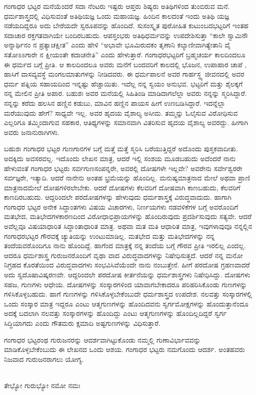 {ಗಂಗಾಧರ ಭಟ್ಟರ ಮನೆಯೆಂದರೆ ಸದಾ ನೆಂಟರು ಇಷ್ಟರು ಆಪ್ತರು ಶಿಷ್ಯರು ಅತಿಥಿ\-ಗಳಿಂದ ತುಂಬಿರುವ ಮನೆ. ಧರ್ಮಶಾಸ್ತ್ರದಲ್ಲಿ ವಿಧಿಸುವಂತೆ ಅತಿಥಿಯಜ್ಞ ಒಂದು ಮಹಾಯಜ್ಞ. ಹಿಂದಿನ ಕಾಲದಂತೆ ಇಂದು ಅತಿಥಿ ಯಜ್ಞ ನಡೆಯದಿದ್ದರೂ ಅದು ಬೇರೆಯದೇ ಸ್ವರೂಪವನ್ನು ಹೊಂದಿದೆ. ಸುಸಂಸ್ಕೃತ ಪುರೋಹಿತ ಕುಟುಂಬದ\break ಭಟ್ಟರಿಗೆ ಇಂತಹ ಸದಾಚಾರ ರಕ್ತಗತವಾಗಿಯೇ ಬಂದಿರಬಹುದು. ಆಪಸ್ತಂಭರು ಅತಿಥಿ\break ಧರ್ಮವನ್ನು ಉಪದೇಶಿಸುತ್ತಾ “ಕಾಲೇ ಸ್ವಾಮಿನೌ ಅನ್ನಾರ್ಥಿನಂ ನ ಪ್ರತ್ಯಾಚಕ್ಷೀತ” ಎಂದು ಹೇಳಿ “ಅಭಾವೇ ಭೂಮಿರುದಕಂ ತೃಣಾನಿ ಕಲ್ಯಾಣೀವಾಗಿತ್ಯೇತಾನಿ ವೈ ಸತೋಽಽ\-ಗಾರೇ ನ ಕ್ಷೀಯಂತೇ ಕದಾಚನೇತಿ” ಎಂದು ಹೇಳುತ್ತಾರೆ. ಗಂಗಾಧರ\break ಭಟ್ಟರಿಗೆ ಬ್ರಹ್ಮಚರ್ಯ ಕಾಲದಿಂದಲೂ ಈ ಧರ್ಮದ ಬಗ್ಗೆ ಪ್ರೀತಿ. ಆ ಕಾಲದಿಂದಲೂ ಅವರು ಮನೆಗೆ ಬಂದವರಿಗೆ ಕಾಲದಲ್ಲಿ ಭೊಜನ, ಉಪಾಹಾರ ಚಾಪೆ , ಹಾಸಿಗೆ ವಾಸವ್ಯವಸ್ಥೆ ಮಂಗಲ\-ಮಾತುಗಳನ್ನು ನೀಡಿದವರು. ಈ ಧರ್ಮಪಾಲನೆ ಅವರ ಗಾರ್ಹಸ್ಥ್ಯ ಜೀವನದಲ್ಲಿ ಅವರ ಧರ್ಮ ಪತ್ನಿಯ ಸಹಾಯದಿಂದ ಇನ್ನಷ್ಟು ಹೆಚ್ಚಾಯಿತು. ಇವೆಲ್ಲ ನನ್ನ ಸ್ವಯಂ ಅನುಭವ. ಭಟ್ಟರಿಗೆ ಮತ್ತು ಶೈಲಕ್ಕಗೆ ನನ್ನ ಮೇಲಿನ ಪ್ರೀತಿ ಅಪಾರ. ಬಹುಶಃ ಅವರ ಮನೆಯಲ್ಲಿ ಸಿಹಿತಿಂಡಿ ಮಾಡಿದಾಗಲೆಲ್ಲಾ ಅವರು ನನ್ನನ್ನು ಸ್ಮರಿಸಿದ್ದಾರೆ. ನನ್ನನ್ನು ಕರೆದು ಹಲಸಿನ ಹಣ್ಣಿನ ಕಡುಬು, ಮಾವಿನ ಹಣ್ಣಿನ ಪಾಯಸ ಹೀಗೆ ಉಣಬಡಿಸಿದ್ದಾರೆ. ಇದನ್ನೆಲ್ಲಾ ಮರೆಯುವುದು ಹೇಗೆ? ಸಾಧ್ಯವೇ ಇಲ್ಲ. ಅವರ ಹೃದಯ ವೈಶಾಲ್ಯ ಅಸೀಮ. ತಮ್ಮನ್ನು ಓಲೈಸುವ ವಿರೋಧಿಸುವ ಎಲ್ಲರಿಗೂ ತಮ್ಮಿಂದಾಗುವ ಸಹಕಾರ, ಆತಿಥ್ಯ\-ಗಳನ್ನು ಸಮಾನವಾಗಿ ವಿತರಿಸುವ ಹೃದಯ ವೈಶಾಲ್ಯ ಅವರದ್ದು. ಹೀಗಾಗಿ ಅವರು ಜನಾನುರಾಗಿಗಳು.

ಬಹುಶಃ ಗಂಗಾಧರ ಭಟ್ಟರ ಗುಣಗಾನಗಳ ಬಗ್ಗೆ ಮತ್ತೆ ಮತ್ತೆ ಸ್ಮರಿಸಿ ಬರೆಯುತ್ತಿದ್ದರೆ ಅದೊಂದು ಪುಸ್ತಕವಾದೀತು. ಅದಕ್ಕಿದು ಅವಸರವಲ್ಲ. ಇದೊಂದು ಲೇಖನ ಮಾತ್ರ, ಆದರೆ ಇಲ್ಲಿ  ಸಂಶಯ ಮೂಡಬಹುದು ಅದೆಂದರೆ ನಾನು ಹೇಳುವಂತೆ ಗಂಗಾಧರ ಭಟ್ಟರು ಸರ್ವಗುಣಸಂಪನ್ನರೇ, ಅವರಲ್ಲಿ ದೋಷಗಳೇ ಇಲ್ಲವೇ? \hbox{ಅವರೇನು} ಸರ್ವೇಶ್ವರರೇ ಸರ್ವಜ್ಞರೇ, ಇತ್ಯಾದಿ. ಆದರೆ ನಾನೇನು ಅಂತಹ ಭ್ರಮೆಯನ್ನು ಹೊಂದಿಲ್ಲ. ಮನುಷ್ಯಮಾತ್ರನಾದ ಮೇಲೆ ಅಥವಾ ಪ್ರಾಣಿ ಮಾತ್ರನಾದಮೇಲೆ ದೋಷಗಳಿರಲೇಬೇಕು. ಆದರೆ ದೋಷಗಳು ಕೆಲವರಿಗೆ ದೋಷವಾಗಿ ಕಾಣಬಹುದು, ಕೆಲವರಿಗೆ ಕಾಣದಿರಬಹುದು. ಆದ್ದರಿಂದಲೇ ಪರದೋಷಗಳನ್ನು ಹೇಳುವುದು ಧರ್ಮಶಾಸ್ತ್ರಕ್ಕೆ \hbox{ವಿರುದ್ಧ}ವಾದುದು. ಹಾಗಾಗಿ ಗಂಗಾಧರ ಭಟ್ಟರ ಅನೇಕ ಸಿದ್ಧಾಂತಗಳು ವಿಷಯ ವಿಚಾರಗಳು, ನಿರ್ಣಯಗಳು ನಡವಳಿಕೆಗಳ ಬಗ್ಗೆ ಅವರೊಂದಿಗೆ ಮತಭೇದ, ಮತಿಭೇದಗಳ\break ಕಾರಣದಿಂದ ವಿರೋಧಾಭಿಪ್ರಾಯಗಳನ್ನು ಹೊಂದಿರುವುದು ಪ್ರದರ್ಶಿಸುವುದು ಸತ್ಯವೇ. ಆದರೆ ಅವೆಲ್ಲವೂ ವಿಷಯಾಧಾರಿತ ಸಿದ್ಧಾಂತಾಧಾರಿತ ಮಾತ್ರ. ಅಥವಾ ಮತ ಮತಿ ಆಧಾರಿತ ಮಾತ್ರ, ಇವುಗಳಾವುವೂ ನನ್ನಲ್ಲಿನ ಗಂಗಾಧರಭಟ್ಟರ ಗೌರವಕ್ಕೆ \hbox{ಚ್ಯುತಿಯನ್ನು} ಉಂಟುಮಾಡಿಲ್ಲ. ಮತಭೇದ ಮತ್ತು ಮತಿಭೇದಗಳನ್ನು ನನ್ನ ತಂದೆಯವರೊಂದಿಗೂ ನಾನು ಹೊಂದಿದ್ದೆ. ಹಾಗೆಂದ ಮಾತ್ರಕ್ಕೆ ನನ್ನ ತಂದೆಯ ಬಗ್ಗೆ ಗೌರವ ಪ್ರೀತಿ \hbox{ಇರಲಿಲ್ಲ} ಎಂದಲ್ಲ. ಆದರೂ ಧರ್ಮಶಾಸ್ತ್ರ ಗುರುಜನರೊಂದಿಗೆ ವೃಥಾ ವಾದ ವಿರುದ್ಧವಾದಗಳನ್ನು ನಿಷೇಧಿಸುತ್ತದೆ. ಆದರೆ ನನ್ನ ಮನೋ ನಿಗ್ರಹದ ಕೊರತೆಯಿಂದ ವಿರುದ್ಧ\-ವಾದಗಳು ಸಂಭವಿಸಿವೆಯೆಂದೇ ನಾನು ನಂಬುತ್ತೇನೆ. ಹೀಗೆ ಪರದೋಷ ಗ್ರಹಣವಾದರೆ ಅದು ಸ್ವದೊಷಾವಿಷ್ಕರಣವೇ. ಆದ್ದರಿಂದಲೇ ಪರದೋಷ ಕೀರ್ತನೆಯನ್ನು ಧರ್ಮ\-ಶಾಸ್ತ್ರಗಳು ನಿಷೇಧಿಸಿದ್ದು. ದೋಷಗಳು ಸಹಜ, ಗುಣಗಳು ಆಧೇಯ. ದೋಷಗಳನ್ನು ಸಂಸ್ಕಾರಗಳಿಂದ ಯಾವಾಗಬೇಕಾದರೂ ಪರಿಹರಿಸಿಕೊಂಡು ಗುಣಗಳನ್ನು ಗಳಿಸಿಕೊಳ್ಳಬಹುದು. ಹಾಗೆ ಗುಣಗಳನ್ನು ಗಳಿಸಿಕೊಳ್ಳಬೇಕೆಂಬುದೇ ಧರ್ಮಶಾಸ್ತ್ರದ ಉಪದೇಶ. ನಲವತ್ತು ಸಂಸ್ಕಾರಗಳಲ್ಲಿ ಒಂದು ಸಂಸ್ಕಾರ ಮಾತ್ರ ಇದ್ದರೂ ಎಂಟು ಆತ್ಮಗುಣಗಳನ್ನು ಹೊಂದಿದವನು ಸ್ವರ್ಗಮೋಕ್ಷಗಳನ್ನು ಹೊಂದುತ್ತಾನೆಂದೂ ಅದಕ್ಕೆ ಬದಲಾಗಿ ನಲವತ್ತು ಸಂಸ್ಕಾರಗಳನ್ನು ಹೊಂದಿದ್ದು ಎಂಟು ಆತ್ಮಗುಣಗಳನ್ನು ಹೊಂದಿಲ್ಲದಿದ್ದರೆ ಸ್ವರ್ಗ ಸಿದ್ಧಿಯಾಗದು ಎಂದು ಗೌತಮರು ಕ್ಷಮಾದಿ ಅಷ್ಟಗುಣಗಳನ್ನು ವಿಧಿಸುತ್ತಾರೆ.

ಗಂಗಾಧರ ಭಟ್ಟರಂಥ ಗುರುಜನರನ್ನು ಆದರ್ಶವಾಗಿಟ್ಟುಕೊಂಡು ನಮ್ಮಲ್ಲಿ ಗುಣಾವಿರ್ಭಾವವನ್ನು ಮಾಡಿಕೊಳ್ಳಬೇಕೆಂಬುದು ಈ ಲೇಖನದ ಒಂದು ಆಶಯ. ಗಂಗಾಧರ ಭಟ್ಟರು ನಮಗೊಂದು ಆದರ್ಶ. ಅಂತಹವರು ನಿಜವಾದ ಗುರುಜನ\-ರಾಗಲು ಯೋಗ್ಯ. \\
~\\[0.4cm]
\centerline{ತೇಭ್ಯೋ ಗುರುಭ್ಯೋ ನಮೋ ನಮಃ }


\articleend
}
